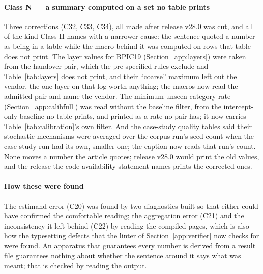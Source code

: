 \paragraph{Class N --- a summary computed on a set no table prints}
Three corrections (C32, C33, C34), all made after release v28.0 was
cut, and all of the kind Class H names with a narrower cause: the sentence
quoted a number as being in a table while the macro behind it was computed on
rows that table does not print. The layer values for BPIC19
(Section~\ref{app:layers}) were taken from the handover pair, which the
pre-specified rules exclude and Table~\ref{tab:layers} does not print, and their
``coarse'' maximum left out the vendor, the one layer on that log worth
anything; the macros now read the admitted pair and name the vendor. The
minimum unseen-category rate (Section~\ref{app:calibfull}) was read without
the baseline filter, from the intercept-only baseline no table prints, and printed as
a rate no pair has; it now carries Table~\ref{tab:calibration}'s own filter.
And the case-study quality tables said their stochastic mechanisms were
averaged over the corpus run's seed count when the case-study run had its
own, smaller one; the caption now reads that run's count. None moves a number
the article quotes; release v28.0 would print the old values, and the release
the code-availability statement names prints the corrected ones.

\paragraph{How these were found}
The estimand error (C20) was found by two diagnostics built so that either
could have confirmed the comfortable reading; the aggregation error (C21) and
the inconsistency it left behind (C22) by reading the compiled pages, which
is also how the typesetting defects that the linter of
Section~\ref{app:verifier} now checks for were found. An apparatus that
guarantees every number is derived from a result file guarantees nothing
about whether the sentence around it says what was meant; that is checked by
reading the output.

